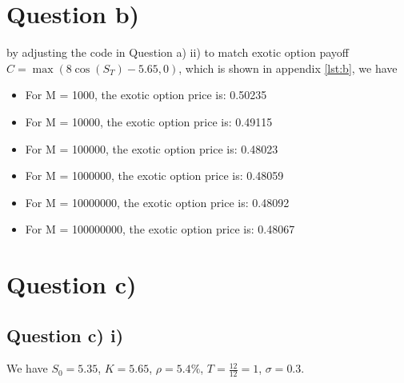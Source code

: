 \documentclass[12pt]{article}
\begin{document}
\section{Question b)}

by adjusting the code in Question a) ii) to match exotic option payoff \(C=\max
\left(8 \cos \left(S_T\right)-5.65,0\right)\), which is shown in appendix
\ref{lst:b}, we have

\begin{itemize}
    \item For M = 1000, the exotic option price is: 0.50235
    \item For M = 10000, the exotic option price is: 0.49115
    \item For M = 100000, the exotic option price is: 0.48023
    \item For M = 1000000, the exotic option price is: 0.48059
    \item For M = 10000000, the exotic option price is: 0.48092
    \item For M = 100000000, the exotic option price is: 0.48067
\end{itemize}

\section{Question c)}

\subsection{Question c) i)}
We have \(S_0=5.35\), \(K=5.65\), \(\rho=5.4\% \), \(T=\frac{12}{12}=1\),
\(\sigma=0.3\).
\end{document}
